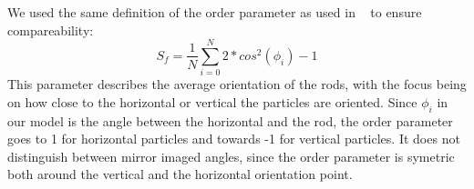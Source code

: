 We used the same definition of the order parameter as used in ~\cite{SED} to ensure compareability:
$$S_f= \frac{1}{N} \sum_{i=0}^N 2*cos^2(\phi_i)-1$$
This parameter describes the average orientation of the rods, with the focus being on how close to the horizontal or vertical the particles are oriented. Since $\phi_i$ in our model is the angle between the horizontal and the rod, the order parameter goes to 1 for horizontal particles and towards -1 for vertical particles. It does not distinguish between mirror imaged angles, since the order parameter is symetric both around the vertical and the horizontal orientation point. 


